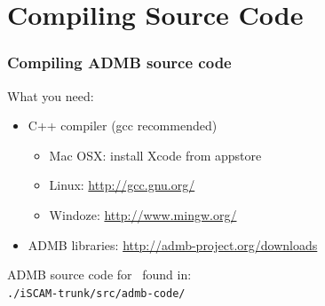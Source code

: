 
\section[Compiling]{Compiling Source Code} %
\label{sec:compiling_source_code}

\begin{frame}
	\frametitle{Compiling ADMB source code}
	What you need:
	\begin{itemize}
		\item C++ compiler (gcc recommended)
		\begin{itemize}
			\item Mac OSX: install Xcode from appstore
			\item Linux: \url{http://gcc.gnu.org/}
			\item Windoze: \url{http://www.mingw.org/}
		\end{itemize}
		\item ADMB libraries: \url{http://admb-project.org/downloads}
	\end{itemize}
	\vfill
	ADMB source code for \iscam\ found in:\\
	\texttt{./iSCAM-trunk/src/admb-code/}
\end{frame}


